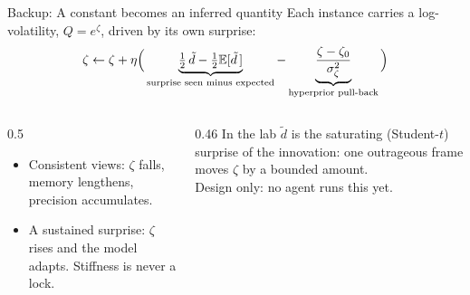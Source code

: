 \documentclass[10pt, aspectratio=169]{beamer}
\begin{document}
\begin{frame}{Backup: A constant becomes an inferred quantity}
  Each instance carries a log-volatility, $Q=e^{\zeta}$, driven by its own surprise:
  \[
    \zeta \leftarrow \zeta + \eta\Big(
      \underbrace{\tfrac12\,\tilde d-\tfrac12\mathbb{E}[\tilde d\,]}_{\text{surprise seen minus expected}}
      - \underbrace{\frac{\zeta-\zeta_0}{\sigma_\zeta^2}}_{\text{hyperprior pull-back}}\Big)
  \]
  \begin{columns}[T]
    \begin{column}{0.5\textwidth}
      \small
      \begin{itemize}
        \item Consistent views: $\zeta$ falls, memory lengthens, precision accumulates.
        \item A sustained surprise: $\zeta$ rises and the model adapts. Stiffness is never a lock.
      \end{itemize}
    \end{column}
    \begin{column}{0.46\textwidth}
      \small
      In the lab $\tilde d$ is the saturating (Student-$t$) surprise of the innovation: one
      outrageous frame moves $\zeta$ by a bounded amount.\\[0.3em]
      \alert{Design only: no agent runs this yet.}
    \end{column}
  \end{columns}
\end{frame}
\end{document}
